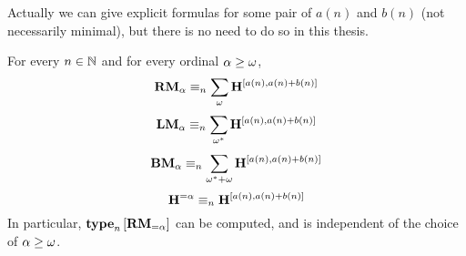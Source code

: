 \begin{note}
    Actually we can give explicit formulas
    for some pair of $a(n)$ and $b(n)$ (not necessarily minimal),
    but there is no need to do so in this thesis.
\end{note}

\begin{lemma}\label{major-computable}
    For every $n \in \mathbb{N}$ and for every ordinal $\alpha \ge \omega$,
    \[
        \mathbf{RM}_{\alpha} \equiv_n \sum_{\omega} \mathbf{H}^{[a(n), a(n) + b(n)]}
    \]
    \[
        \mathbf{LM}_{\alpha} \equiv_n \sum_{\omega^\ast} \mathbf{H}^{[a(n), a(n) + b(n)]}
    \]
    \[
        \mathbf{BM}_{\alpha} \equiv_n \sum_{\omega^\ast + \omega} \mathbf{H}^{[a(n), a(n) + b(n)]}
    \]
    \[
        \mathbf{H}^{= \alpha} \equiv_n \mathbf{H}^{[a(n), a(n) + b(n)]}
    \]
    In particular, $\mathbf{type}_{n} \left[ {\mathbf{RM}_{= \alpha}} \right]$ can be computed,
    and is independent of the choice of $\alpha \ge \omega$.
\end{lemma}

